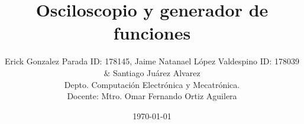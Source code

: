 \documentclass{article}
\begin{document}

\renewcommand{\footrulewidth}{1pt}
\renewcommand{\tablename}{Tabla}
\renewcommand{\figurename}{Figura}


\title{Osciloscopio y generador de funciones}
\author{\small{Erick Gonzalez Parada ID: 178145, Jaime Natanael López Valdespino ID: 178039
	$\&$ Santiago Juárez Alvarez }\\ 
\small{ Depto. Computación Electrónica y Mecatrónica.} \\
\small {Docente: Mtro. Omar Fernando Ortiz Aguilera}}
\date{\small{\today}}
\maketitle
\end{document}
